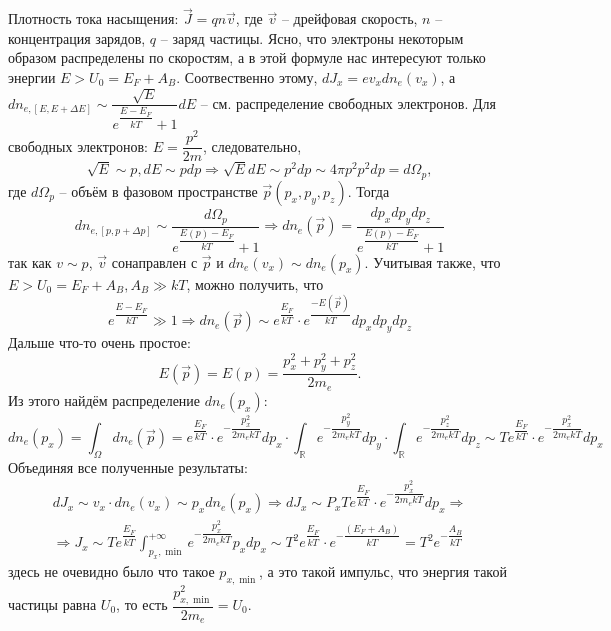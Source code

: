 Плотность тока насыщения: $\vec{J} = q n \vec{v}$, где $\vec{v}$ -- дрейфовая скорость, 
$n$ -- концентрация зарядов, $q$ -- заряд частицы. Ясно, что электроны некоторым образом
распределены по скоростям, а в этой формуле нас интересуют только энергии
$E > U_0 = E_F + A_B$. Соотвественно этому, $d J_x = e v_x dn_e (v_x)$, а
$dn_{e, [E, E+\Delta E]} \sim \dfrac{\sqrt{E}}{e^{\dfrac{E-E_F}{kT}} + 1} dE$ -- см.
распределение свободных электронов. Для свободных электронов: $E = \dfrac{p^2}{2m}$,
следовательно,
\[
  \sqrt{E} \sim p, dE \sim p dp \Rightarrow \sqrt{E} dE \sim p^2 dp \sim 4\pi p^2 p^2 dp = d \Omega_p,
\]
где $d\Omega_p$ -- объём в фазовом пространстве $\vec{p} (p_x, p_y, p_z)$. Тогда
\[
  dn_{e, [p, p+\Delta p]} \sim \dfrac{d\Omega_p}{e^\dfrac{E(p) - E_F}{kT} + 1}
  \Rightarrow
  dn_e (\vec{p}) = \dfrac{dp_x dp_y dp_z}{e^\dfrac{E(p) - E_F}{kT} + 1}
\]
так как $v \sim p$, $\vec{v}$ сонаправлен с $\vec{p}$ и $dn_e (v_x) \sim dn_e(p_x)$.
Учитывая также, что $E > U_0 = E_F + A_B, A_B \gg kT$, можно получить, что 
\[
  e^{\dfrac{E-E_F}{kT}} \gg 1
  \Rightarrow
  dn_e (\vec{p}) \sim e^{\dfrac{E_F}{kT}} \cdot e^{\dfrac{- E(\vec{p})}{kT}} dp_x dp_y dp_z
\]
Дальше что-то очень простое:
\[
  E(\vec{p}) = E(p) = \dfrac{p_x^2 + p_y^2 + p_z^2}{2m_e}.
\]
Из этого найдём распределение $dn_e (p_x)$:
\[
  dn_e (p_x) = \int_\Omega dn_e (\vec{p}) = e^{\dfrac{E_F}{kT}} \cdot 
  e^{- \dfrac{p_x^2}{2m_e kT}} dp_x \cdot 
  \int_\mathbb{R} e^{- \dfrac{p_y^2}{2m_e kT}} dp_y \cdot 
  \int_\mathbb{R} e^{- \dfrac{p_z^2}{2m_e kT}} dp_z
  \sim T e^{\dfrac{E_F}{kT}} \cdot e^{-\dfrac{p_x^2}{2m_e kT}} dp_x
\]
Объединяя все полученные результаты:
\begin{multline*}
  dJ_x \sim v_x \cdot dn_e (v_x) \sim p_x dn_e (p_x)
  \Rightarrow
  dJ_x \sim P_x T e^{\dfrac{E_F}{kT}} \cdot e^{-\dfrac{p_x^2}{2m_e kT}} dp_x
  \Rightarrow \\
  \Rightarrow
  J_x \sim T e^{\dfrac{E_F}{kT}} \int_{p_x, \min}^{+\infty} e^{-\dfrac{p_x^2}{2m_e kT}} p_x dp_x
  \sim T^2 e^{\dfrac{E_F}{kT}} \cdot e^{-\dfrac{(E_F + A_B)}{kT}}
  = T^2 e^{- \dfrac{A_B}{kT}}
\end{multline*}
здесь не очевидно было что такое $p_{x, \min}$, а это такой импульс, что энергия такой частицы
равна $U_0$, то есть $\dfrac{p_{x, \min}^2}{2m_e} = U_0$.
